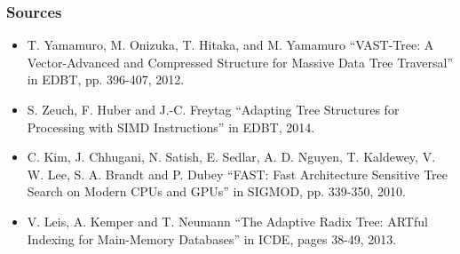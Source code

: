 \documentclass{beamer}
\begin{document}
\begin{frame}
\frametitle{Sources}
\begin{itemize}
	\item T. Yamamuro, M. Onizuka, T. Hitaka, and M. Yamamuro ``VAST-Tree: A Vector-Advanced and Compressed Structure for Massive Data Tree Traversal'' in EDBT, pp. 396-407, 2012.
	\item S. Zeuch, F. Huber and J.-C. Freytag  ``Adapting Tree Structures for Processing with SIMD Instructions'' in EDBT, 2014.
	\item C. Kim, J. Chhugani, N. Satish, E. Sedlar, A. D. Nguyen, T. Kaldewey, V. W. Lee, S. A. Brandt and P. Dubey ``FAST: Fast Architecture Sensitive Tree Search on Modern CPUs and GPUs'' in SIGMOD, pp. 339-350, 2010.
	\item V. Leis, A. Kemper and T. Neumann ``The Adaptive Radix Tree: ARTful Indexing for Main-Memory Databases'' in ICDE, pages 38-49, 2013.
\end{itemize}
\end{frame}

\end{document}
